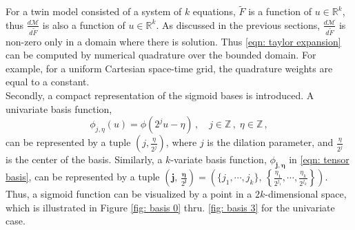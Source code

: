 For a twin model consisted of a system of $k$ equations,
$\tilde{F}$ is a function of $u\in\mathbb{R}^k$, thus 
$\frac{d\mathcal{M}}{d\tilde{F}}$ is also a function of $u\in\mathbb{R}^k$.
As discussed in the previous sections, $\frac{d \mathcal{M}}{d\tilde{F}}$ is non-zero only in a
domain where there is solution. Thus \eqref{eqn: taylor expansion} 
can be computed by numerical quadrature over the bounded domain.
For example, for a uniform Cartesian space-time grid, the quadrature weights are equal to a constant.
\\

Secondly, a compact representation of the sigmoid bases is introduced.
A univariate basis function,
\begin{equation*}
    {\phi}_{j,\eta}(u) = {\phi}(2^j u-\eta) \,,\quad j\in \mathbb{Z} \,,\;\eta \in \mathbb{Z}\,,
    \label{eqn: self similar sigmoid}
\end{equation*}
can be represented by a tuple $(j, \frac{\eta}{2^j})$,
where $j$ is the dilation parameter, and $\frac{\eta}{2^j}$ is
the center of the basis.
Similarly, a $k$-variate basis function, $\phi_{\boldsymbol{j}, \boldsymbol{\eta}}$ in
\eqref{eqn: tensor basis}, can be represented by a tuple $\left(\boldsymbol{j}, \,
\frac{\boldsymbol{\eta}}{2^{\boldsymbol{j}}}\right) 
= \left(\{j_1,\cdots, j_k\}, \, \left\{\frac{\eta_1}{2^{j_1}}, \cdots, \frac{\eta_k}{2^{j_k}}\right\}\right)$.
Thus, a sigmoid function can be visualized by a point in a $2k$-dimensional space,
which is illustrated in Figure \ref{fig: basis 0} thru. \ref{fig: basis 3} 
for the univariate case.
